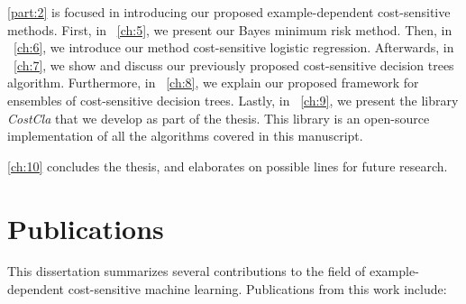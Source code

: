 \partname{ \ref{part:2}} is focused in introducing our proposed example-dependent cost-sensitive 
methods. First, in \chaptername{~\ref{ch:5}}, we present our Bayes minimum risk method. Then, in 
\chaptername{~\ref{ch:6}}, we introduce our method cost-sensitive logistic regression. Afterwards, 
in \chaptername{~\ref{ch:7}}, we show and discuss our previously proposed cost-sensitive decision 
trees algorithm. Furthermore, in \chaptername{~\ref{ch:8}}, we explain our proposed framework for 
ensembles of cost-sensitive decision trees. Lastly, in \chaptername{~\ref{ch:9}}, we present the 
library \mbox{\textit{CostCla}} that we develop as part of the thesis. This library is an 
open-source implementation of all the algorithms covered in this manuscript.

\chaptername{ \ref{ch:10}} concludes the thesis, and elaborates on possible lines for future 
research.

\section{Publications}

This dissertation summarizes several contributions to the field of example-dependent 
cost-sensitive machine learning. Publications from this work include:
\bigskip

